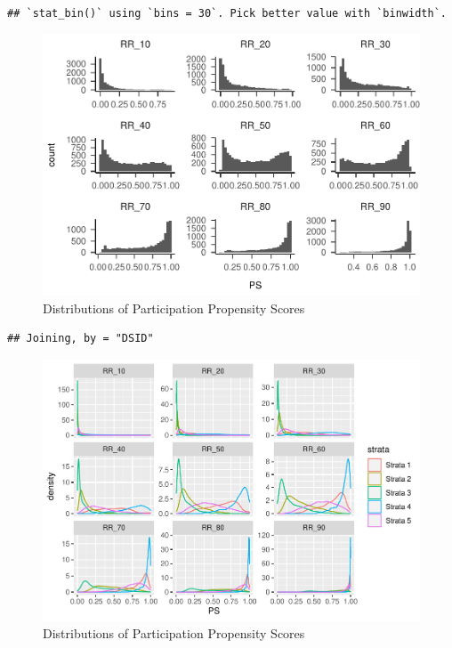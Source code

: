 \documentclass[
  english,
  man,floatsintext]{apa6}
\begin{document}
\begin{verbatim}
## `stat_bin()` using `bins = 30`. Pick better value with `binwidth`.
\end{verbatim}

\begin{figure}
\centering
\includegraphics{5---Analysis_files/figure-latex/unnamed-chunk-13-1.pdf}
\caption{\label{fig:unnamed-chunk-13-1}Distributions of Participation Propensity Scores}
\end{figure}

\begin{verbatim}
## Joining, by = "DSID"
\end{verbatim}

\begin{figure}
\centering
\includegraphics{5---Analysis_files/figure-latex/unnamed-chunk-13-2.pdf}
\caption{\label{fig:unnamed-chunk-13-2}Distributions of Participation Propensity Scores}
\end{figure}
\end{document}
